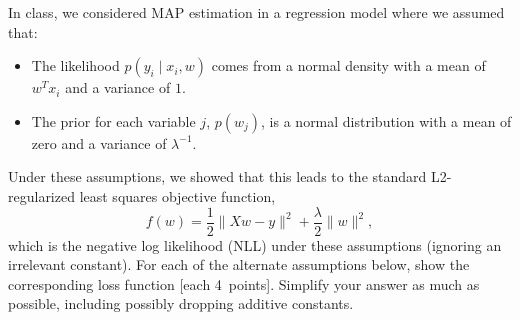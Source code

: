 \documentclass{article}
\newcommand{\blu}[1]{{\textcolor{blu}{#1}}}
\let\ask\blu
\newcommand\pts[1]{\textcolor{pointscolour}{[#1~points]}}
\newcommand{\norm}[1]{\lVert #1 \rVert}
\begin{document}
In class, we considered MAP estimation in a regression model where we assumed that:
\begin{itemize}
\item The likelihood $p(y_i \mid x_i, w)$ comes from a normal density with a mean of $w^Tx_i$ and a variance of $1$.
\item The prior for each variable $j$, $p(w_j)$, is a normal distribution with a mean of zero and a variance of $\lambda^{-1}$.
\end{itemize}
Under these assumptions, we showed that this leads to the standard L2-regularized least squares objective function,
\[
f(w) = \frac{1}{2}\norm{Xw - y}^2 + \frac \lambda 2 \norm{w}^2,
\]
which is the negative log likelihood (NLL) under these assumptions (ignoring an irrelevant constant).
\ask{For each of the alternate assumptions below, show the corresponding loss function} \pts{each 4}. Simplify your answer as much as possible, including possibly dropping additive constants.
\end{document}
